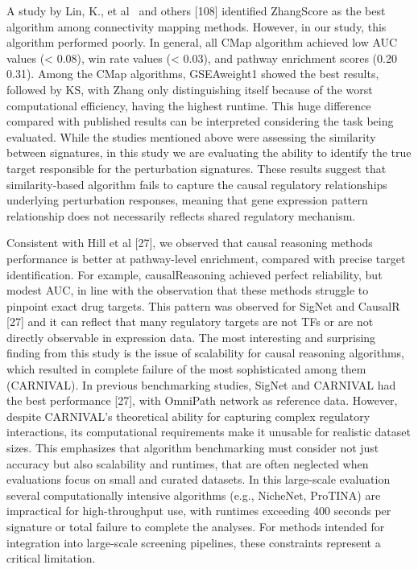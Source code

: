 A study by Lin, K., et al~\cite{RN79} and others [108] identified ZhangScore as the best algorithm among connectivity mapping methods. However, in our study, this algorithm performed poorly. In general, all CMap algorithm achieved low AUC values (< 0.08), win rate values (< 0.03), and pathway enrichment scores (0.20  0.31). Among the CMap algorithms, GSEAweight1 showed the best results, followed by KS, with Zhang only distinguishing itself because of the worst computational efficiency, having the highest runtime. This huge difference compared with published results can be interpreted considering the task being evaluated. While the studies mentioned above were assessing the similarity between signatures, in this study we are evaluating the ability to identify the true target responsible for the perturbation signatures. These results suggest that similarity-based algorithm fails to capture the causal regulatory relationships underlying perturbation responses, meaning that gene expression pattern relationship does not necessarily reflects shared regulatory mechanism.

Consistent with Hill et al [27], we observed that causal reasoning methods performance is better at pathway-level enrichment, compared with precise target identification. For example, causalReasoning achieved perfect reliability, but modest AUC, in line with the observation that these methods struggle to pinpoint exact drug targets. This pattern was observed for SigNet and CausalR [27] and it can reflect that many regulatory targets are not TFs or are not directly observable in expression data. The most interesting and surprising finding from this study is the issue of scalability for causal reasoning algorithms, which resulted in complete failure of the most sophisticated among them (CARNIVAL). In previous benchmarking studies, SigNet and CARNIVAL had the best performance [27], with OmniPath network as reference data. However, despite CARNIVAL's theoretical ability for capturing complex regulatory interactions, its computational requirements make it unusable for realistic dataset sizes. This emphasizes that algorithm benchmarking must consider not just accuracy but also scalability and runtimes, that are often neglected when evaluations focus on small and curated datasets. In this large-scale evaluation several computationally intensive algorithms (e.g., NicheNet, ProTINA) are impractical for high-throughput use, with runtimes exceeding 400 seconds per signature or total failure to complete the analyses. For methods intended for integration into large-scale screening pipelines, these constraints represent a critical limitation.

